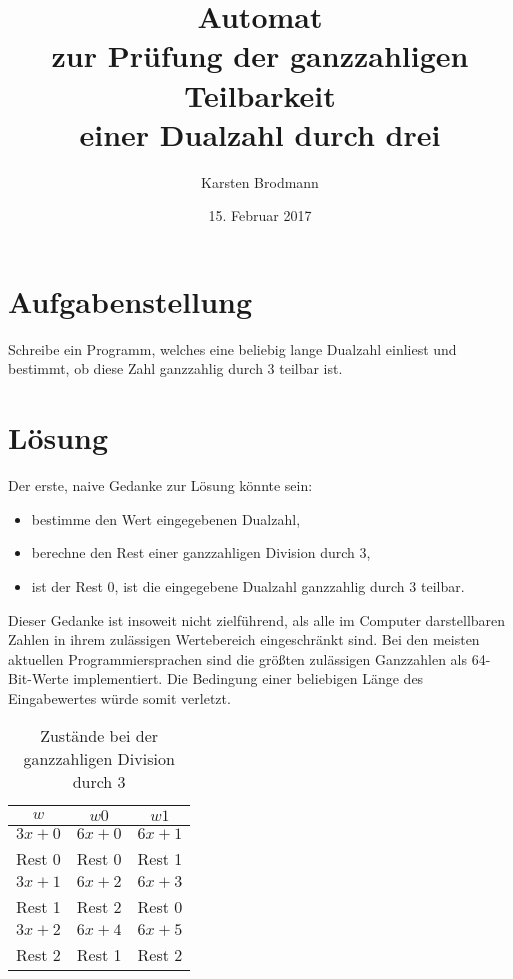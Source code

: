 \documentclass[draft=false]{scrartcl}
\begin{document}
\title{Automat \\
zur Prüfung der ganzzahligen Teilbarkeit \\
einer Dualzahl durch drei}
\author{Karsten Brodmann}
\date{15. Februar 2017}
\maketitle

\section{Aufgabenstellung} 

Schreibe ein Programm, welches eine beliebig lange Dualzahl einliest und bestimmt, ob diese Zahl ganzzahlig durch 3 teilbar ist.

\section{Lösung} 

Der erste, naive Gedanke zur Lösung könnte sein:

\begin{itemize} 
\item bestimme den Wert eingegebenen Dualzahl, 
\item berechne den Rest einer ganzzahligen Division durch 3, 
\item ist der Rest 0, ist die eingegebene Dualzahl ganzzahlig durch 3
      teilbar.
\end{itemize}

Dieser Gedanke ist insoweit nicht zielführend, als alle im Computer darstellbaren Zahlen in ihrem zulässigen Wertebereich eingeschränkt sind. Bei den meisten aktuellen Programmiersprachen sind die größten zulässigen Ganzzahlen als 64-Bit-Werte implementiert. Die Bedingung einer beliebigen Länge des Eingabewertes würde somit verletzt.

\begin{table}[!htbp] \begin{center} \begin{tabular}{|c|c|c|} 
\hline
 $w$ & $w0$ & $w1$ \\
\hline 
\hline 
$3x+0$ & $6x+0$ & $6x+1$                                   \\ 
Rest 0 & Rest 0 & Rest 1                                   \\ 
\hline 
$3x+1$ & $6x+2$ & $6x+3$                                   \\ 
Rest 1 & Rest 2 & Rest 0                                   \\
\hline 
$3x+2$ & $6x+4$ & $6x+5$                                   \\ 
Rest 2 & Rest 1 & Rest 2                                   \\ 
\hline
\end{tabular}\end{center}
	\caption{Zustände bei der ganzzahligen Division durch 3}
	\label{tab:zustaende}
\end{table}
\end{document}
